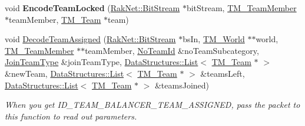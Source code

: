 \begin{DoxyCompactItemize}
\item 
\hypertarget{class_rak_net_1_1_team_manager_abdac3bb7b0cf2c3353ffbf3092803e22}{void {\bfseries Encode\-Team\-Locked} (\hyperlink{class_rak_net_1_1_bit_stream}{Rak\-Net\-::\-Bit\-Stream} $\ast$bit\-Stream, \hyperlink{class_rak_net_1_1_t_m___team_member}{T\-M\-\_\-\-Team\-Member} $\ast$team\-Member, \hyperlink{class_rak_net_1_1_t_m___team}{T\-M\-\_\-\-Team} $\ast$team)}\label{class_rak_net_1_1_team_manager_abdac3bb7b0cf2c3353ffbf3092803e22}

\item 
void \hyperlink{class_rak_net_1_1_team_manager_ab13fe5e3538ade5e2e713be93e5641f9}{Decode\-Team\-Assigned} (\hyperlink{class_rak_net_1_1_bit_stream}{Rak\-Net\-::\-Bit\-Stream} $\ast$bs\-In, \hyperlink{class_rak_net_1_1_t_m___world}{T\-M\-\_\-\-World} $\ast$$\ast$world, \hyperlink{class_rak_net_1_1_t_m___team_member}{T\-M\-\_\-\-Team\-Member} $\ast$$\ast$team\-Member, \hyperlink{group___t_e_a_m___m_a_n_a_g_e_r___g_r_o_u_p_gadd1e99b7724ceb0f6794f46de31a6b02}{No\-Team\-Id} \&no\-Team\-Subcategory, \hyperlink{group___t_e_a_m___m_a_n_a_g_e_r___g_r_o_u_p_ga8a8704b992ae17ee4789b2ba4cc4b34b}{Join\-Team\-Type} \&join\-Team\-Type, \hyperlink{class_data_structures_1_1_list}{Data\-Structures\-::\-List}$<$ \hyperlink{class_rak_net_1_1_t_m___team}{T\-M\-\_\-\-Team} $\ast$ $>$ \&new\-Team, \hyperlink{class_data_structures_1_1_list}{Data\-Structures\-::\-List}$<$ \hyperlink{class_rak_net_1_1_t_m___team}{T\-M\-\_\-\-Team} $\ast$ $>$ \&teams\-Left, \hyperlink{class_data_structures_1_1_list}{Data\-Structures\-::\-List}$<$ \hyperlink{class_rak_net_1_1_t_m___team}{T\-M\-\_\-\-Team} $\ast$ $>$ \&teams\-Joined)
\begin{DoxyCompactList}\small\item\em When you get I\-D\-\_\-\-T\-E\-A\-M\-\_\-\-B\-A\-L\-A\-N\-C\-E\-R\-\_\-\-T\-E\-A\-M\-\_\-\-A\-S\-S\-I\-G\-N\-E\-D, pass the packet to this function to read out parameters. \end{DoxyCompactList}\end{DoxyCompactItemize}
